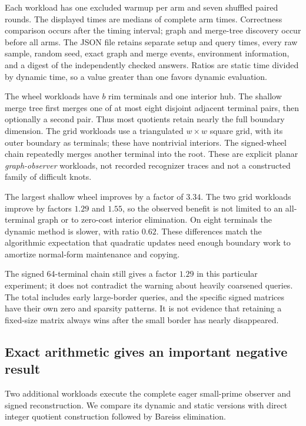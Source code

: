 \documentclass[11pt,letterpaper]{article}
\theoremstyle{definition}\newtheorem{definition}[theorem]{Definition}
\theoremstyle{remark}\newtheorem{remark}[theorem]{Remark}
\begin{document}
Each workload has one excluded warmup per arm and seven shuffled paired rounds. The displayed times are medians of complete arm times. Correctness comparison occurs after the timing interval; graph and merge-tree discovery occur before all arms. The JSON file retains separate setup and query times, every raw sample, random seed, exact graph and merge events, environment information, and a digest of the independently checked answers. Ratios are static time divided by dynamic time, so a value greater than one favors dynamic evaluation.

The wheel workloads have $b$ rim terminals and one interior hub. The shallow merge tree first merges one of at most eight disjoint adjacent terminal pairs, then optionally a second pair. Thus most quotients retain nearly the full boundary dimension. The grid workloads use a triangulated $w\times w$ square grid, with its outer boundary as terminals; these have nontrivial interiors. The signed-wheel chain repeatedly merges another terminal into the root. These are explicit planar \emph{graph-observer} workloads, not recorded recognizer traces and not a constructed family of difficult knots.


\begin{table}[htbp]
\centering
\small
\setlength{\tabcolsep}{4pt}

\caption{Finite-field observer measurements, fresh setup included. ``Control'' is the static/control ratio. No whole-recognizer timing is represented.}
\label{tab:bench}
\end{table}


The largest shallow wheel improves by a factor of $3.34$. The two grid workloads improve by factors $1.29$ and $1.55$, so the observed benefit is not limited to an all-terminal graph or to zero-cost interior elimination. On eight terminals the dynamic method is slower, with ratio $0.62$. These differences match the algorithmic expectation that quadratic updates need enough boundary work to amortize normal-form maintenance and copying.

The signed 64-terminal chain still gives a factor $1.29$ in this particular experiment; it does not contradict the warning about heavily coarsened queries. The total includes early large-border queries, and the specific signed matrices have their own zero and sparsity patterns. It is not evidence that retaining a fixed-size matrix always wins after the small border has nearly disappeared.

\subsection{Exact arithmetic gives an important negative result}
Two additional workloads execute the complete eager small-prime observer and signed reconstruction. We compare its dynamic and static versions with direct integer quotient construction followed by Bareiss elimination.
\end{document}
